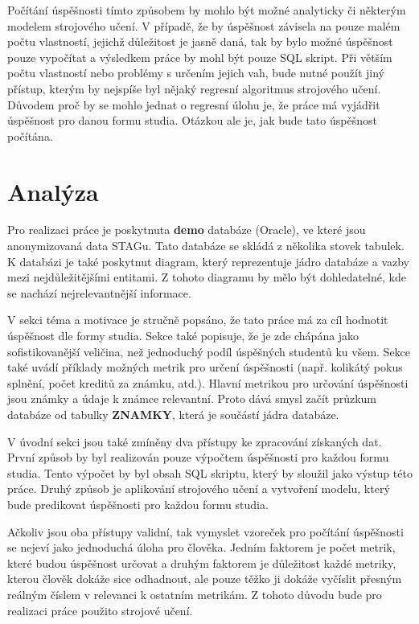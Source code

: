 \documentclass[12pt, letterpaper]{article}
\begin{document}
Počítání úspěšnosti tímto způsobem by mohlo být možné analyticky či některým modelem strojového učení. V případě, že by
úspěšnost závisela na pouze malém počtu vlastností, jejichž důležitost je jasně daná, tak by bylo možné úspěšnost 
pouze vypočítat a výsledkem práce by mohl být pouze SQL skript. Při větším počtu vlastností nebo problémy s určením
jejich vah, bude nutné použít jiný přístup, kterým by nejspíše byl nějaký regresní algoritmus strojového učení. Důvodem
proč by se mohlo jednat o regresní úlohu je, že práce má vyjádřit úspěšnost pro danou formu studia. Otázkou ale je,
jak bude tato úspěšnost počítána.
\section{Analýza}
Pro realizaci práce je poskytnuta \textbf{demo} databáze (Oracle), ve které jsou anonymizovaná data STAGu. Tato
databáze se skládá z několika stovek tabulek. K databázi je také poskytnut diagram, který reprezentuje jádro 
databáze a vazby mezi nejdůležitějšími entitami. Z tohoto diagramu by mělo být dohledatelné, kde se nachází 
nejrelevantnější informace.

V sekci téma a motivace je stručně popsáno, že tato práce má za cíl hodnotit úspěšnost dle formy studia. Sekce také 
popisuje, že  je zde chápána jako sofistikovanější veličina, než jednoduchý podíl úspěšných studentů ku 
všem. Sekce také uvádí příklady možných metrik pro určení úspěšnosti (např. kolikátý pokus splnění, počet kreditů za 
známku, atd.). Hlavní metrikou pro určování úspěšnosti jsou známky a údaje k známce relevantní. Proto dává smysl 
začít průzkum databáze od tabulky \textbf{ZNAMKY}, která je součástí jádra databáze.

V úvodní sekci jsou také zmíněny dva přístupy ke zpracování získaných dat. První způsob by byl realizován pouze
výpočtem úspěšnosti pro každou formu studia. Tento výpočet by byl obsah SQL skriptu, který by sloužil jako výstup této 
práce. Druhý způsob je aplikování strojového učení a vytvoření modelu, který bude predikovat úspěšnosti pro každou 
formu studia. 

Ačkoliv jsou oba přístupy validní, tak vymyslet vzoreček pro počítání úspěšnosti se nejeví jako jednoduchá úloha pro
člověka. Jedním faktorem je počet metrik, které budou úspěšnost určovat a druhým faktorem je důležitost každé metriky,
kterou člověk dokáže sice odhadnout, ale pouze těžko ji dokáže vyčíslit přesným reálným číslem v relevanci k ostatním 
metrikám. Z tohoto důvodu bude pro realizaci práce použito strojové učení.
\end{document}

